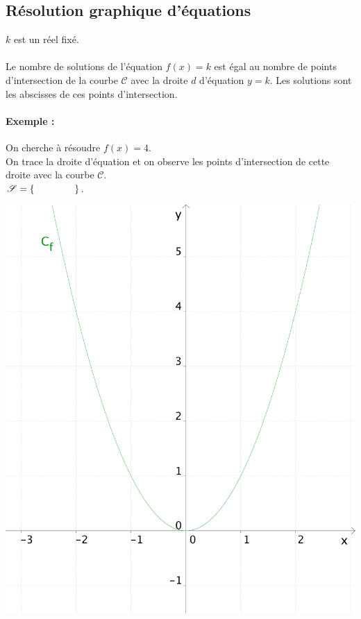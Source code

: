 \medskip


\subsection{Résolution graphique d'équations}

$k$ est un réel fixé. \\

\noindent
{} \\

Le nombre de solutions de l'équation $f(x)=k$ est égal au nombre de
points d'intersection de la courbe $\mathscr{C}$ avec la droite $d$
d'équation $y=k$. Les solutions sont les abscisses de ces points
d'intersection. 

\paragraph{Exemple :} 
\begin{minipage}[t]{0.55\linewidth}
  On cherche à résoudre $f(x)=4$. \\
  On trace la droite d'équation \hspace{1.5cm} et
  on observe les points d'intersection de cette droite avec la courbe
  $\mathscr{C}$. \\[1ex]
  $\mathscr{S}=\{\hspace{1.5cm}\}$. 
\end{minipage}
\qquad
\begin{minipage}[c]{0.25\linewidth}
  \includegraphics[width=\textwidth]{F_reseq_f.pdf}
\end{minipage}


